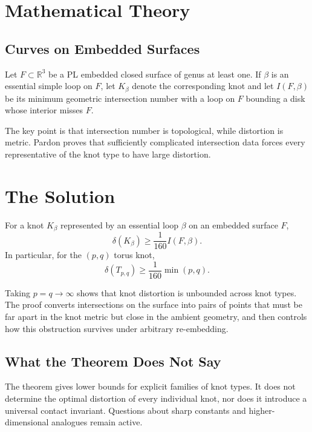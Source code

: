 \section{Mathematical Theory}

\subsection{Curves on Embedded Surfaces}

Let $F\subset\mathbb{R}^3$ be a PL embedded closed surface of genus at least one. If $\beta$ is an essential simple loop on $F$, let $K_\beta$ denote the corresponding knot and let $I(F,\beta)$ be its minimum geometric intersection number with a loop on $F$ bounding a disk whose interior misses $F$.

The key point is that intersection number is topological, while distortion is metric. Pardon proves that sufficiently complicated intersection data forces every representative of the knot type to have large distortion.

\section{The Solution}

\begin{theorem}
For a knot $K_\beta$ represented by an essential loop $\beta$ on an embedded surface $F$,
\[
\delta(K_\beta)\geq \frac{1}{160}I(F,\beta).
\]
In particular, for the $(p,q)$ torus knot,
\[
\delta(T_{p,q})\geq \frac{1}{160}\min(p,q).
\]
\end{theorem}

Taking $p=q\to\infty$ shows that knot distortion is unbounded across knot types. The proof converts intersections on the surface into pairs of points that must be far apart in the knot metric but close in the ambient geometry, and then controls how this obstruction survives under arbitrary re-embedding.

\subsection{What the Theorem Does Not Say}

The theorem gives lower bounds for explicit families of knot types. It does not determine the optimal distortion of every individual knot, nor does it introduce a universal contact invariant. Questions about sharp constants and higher-dimensional analogues remain active.

